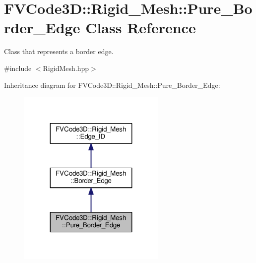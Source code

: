 \hypertarget{classFVCode3D_1_1Rigid__Mesh_1_1Pure__Border__Edge}{}\section{F\+V\+Code3D\+:\+:Rigid\+\_\+\+Mesh\+:\+:Pure\+\_\+\+Border\+\_\+\+Edge Class Reference}
\label{classFVCode3D_1_1Rigid__Mesh_1_1Pure__Border__Edge}


Class that represents a border edge.  




{\ttfamily \#include $<$Rigid\+Mesh.\+hpp$>$}



Inheritance diagram for F\+V\+Code3D\+:\+:Rigid\+\_\+\+Mesh\+:\+:Pure\+\_\+\+Border\+\_\+\+Edge\+:
\nopagebreak
\begin{figure}[H]
\begin{center}
\leavevmode
\includegraphics[width=203pt]{classFVCode3D_1_1Rigid__Mesh_1_1Pure__Border__Edge__inherit__graph}
\end{center}
\end{figure}


